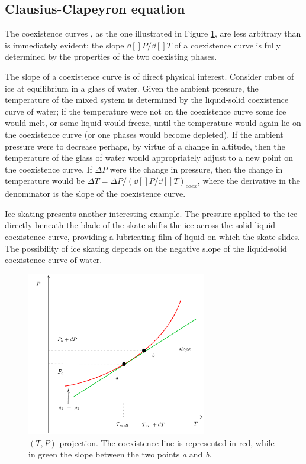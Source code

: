 \documentclass[../main/main.tex]{subfiles}
\begin{document}
\subsection{Clausius-Clapeyron equation}
The coexistence curves \cite{3_lesson_2}, as the one illustrated in Figure  \ref{fig:3_1}, are less arbitrary than is immediately evident; the slope \( \dd[]{P} /\dd[]{T}   \) of a coexistence curve is fully determined by the properties of the two coexisting phases.

The slope of a coexistence curve is of direct physical interest. Consider cubes of ice at equilibrium in a glass of water. Given the ambient pressure, the temperature of the mixed system is determined by the liquid-solid coexistence curve of water; if the temperature were not on the coexistence curve some ice would melt, or some liquid would freeze, until the temperature would again lie on the coexistence curve (or one phases would become depleted). If the ambient pressure were to decrease perhaps, by virtue of a change in altitude, then the temperature of the glass of water would appropriately adjust to a new point on the coexistence curve. If \( \Delta P \) were the change in pressure, then the change in temperature would be \( \Delta T = \Delta P / (\dd[]{P} /\dd[]{T})_{coex} \), where the derivative in the denominator is the slope of the coexistence curve.

\begin{remark}
Ice skating presents another interesting example. The pressure applied to the ice directly beneath the blade of the skate shifts the ice across the solid-liquid coexistence curve, providing a lubricating film of liquid on which the skate slides. The possibility of ice skating depends on the negative slope of the liquid-solid coexistence curve of water.
\end{remark}
\begin{figure}[h!]
\centering
\includegraphics[width=0.7\textwidth]{../lessons/3_image/2.pdf}
\caption{\label{fig:3_1} \( (T,P) \) projection. The coexistence line is represented in red, while in green the slope between the two points \emph{a} and \emph{b}.}
\end{figure}
\end{document}
